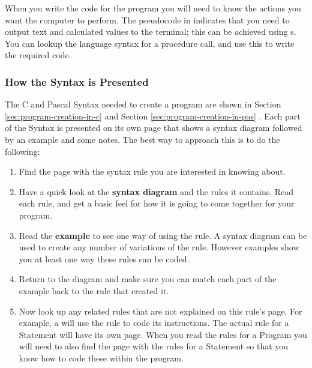 
When you write the code for the program you will need to know the actions you want the computer to perform. The pseudocode in  indicates that you need to output text and calculated values to the terminal; this can be achieved using s. You can lookup the language syntax for a procedure call, and use this to write the required code. 


\subsubsection{How the Syntax is Presented} %
\label{ssub:how_the_syntax_is_presented}

The C and Pascal Syntax needed to create a program are shown in Section \ref{sec:program-creation-in-c}  and Section \ref{sec:program-creation-in-pas} . Each part of the Syntax is presented on its own page that shows a syntax diagram followed by an example and some notes. The best way to approach this is to do the following:

\begin{enumerate}
  \item Find the page with the syntax rule you are interested in knowing about.
  \item Have a quick look at the \textbf{syntax diagram} and the rules it contains. Read each rule, and get a basic feel for how it is going to come together for your program.
  \item Read the \textbf{example} to see one way of using the rule. A syntax diagram can be used to create any number of variations of the rule. However examples show you at least one way these rules can be coded.
  \item Return to the diagram and make sure you can match each part of the example back to the rule that created it.
  \item Now look up any related rules that are not explained on this rule's page. For example, a  will use the  rule to code its instructions. The actual rule for a Statement will have its own page. When you read the rules for a Program you will need to also find the page with the rules for a Statement so that you know how to code these within the program.
\end{enumerate}

